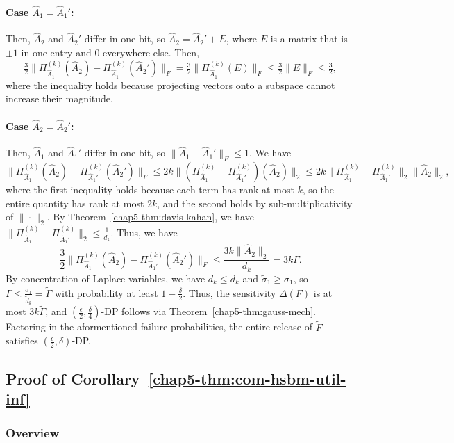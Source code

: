 \paragraph{Case $\hat{A}_1 = \hat{A}_1'$:} Then, $\hat{A}_2$ and $\hat{A}_2'$ differ in one bit, so $\hat{A}_2 = \hat{A}_2' + E$, where $E$ is a matrix that is $\pm 1$ in one entry and $0$ everywhere else.
Then,
\[
\tfrac 3 2\|\Pi_{\hat{A}_1}^{(k)}(\hat{A}_2) - \Pi_{\hat{A}_1}^{(k)}(\hat{A}_2')\|_F = \tfrac 3 2\|\Pi_{\hat{A}_1}^{(k)}(E)\|_F \leq \tfrac 3 2\|E\|_F \leq \tfrac 3 2,
\]
where the inequality holds because projecting vectors onto a subspace cannot increase their magnitude.

\paragraph{Case $\hat{A}_2 = \hat{A}_2'$:} Then, $\hat{A}_1$ and $\hat{A}_1'$ differ in one bit, so $\|\hat{A}_1 - \hat{A}_1'\|_F \leq 1$. We have
\[
\|\Pi_{\hat{A}_1}^{(k)}(\hat{A}_2) - \Pi_{\hat{A}_1'}^{(k)}(\hat{A}_2')\|_F \leq 2k \|(\Pi_{\hat{A}_1}^{(k)} - \Pi_{\hat{A}_1'}^{(k)})(\hat{A}_2)\|_2 \leq 2k\|\Pi_{\hat{A}_1}^{(k)} - \Pi_{\hat{A}_1'}^{(k)}\|_2\|\hat{A}_2\|_2,
\]
where the first inequality holds because each term has rank at most $k$, so the entire quantity has rank at most $2k$, and the  second holds by sub-multiplicativity of $\|\cdot\|_2$.
By Theorem~\ref{chap5-thm:davis-kahan}, we have $\|\Pi_{\hat{A}_1}^{(k)} - \Pi_{\hat{A}_1'}^{(k)}\|_2 \leq \frac{1}{d_k}$.
Thus, we have
\[
\frac 3 2 \|\Pi_{\hat{A}_1}^{(k)}(\hat{A}_2) - \Pi_{\hat{A}_1'}^{(k)}(\hat{A}_2')\|_F \leq \frac{3k\|\hat{A}_2\|_2}{d_k} = 3k\Gamma.
\]
By concentration of Laplace variables, we have $\tilde{d}_k \leq d_k$ and $\tilde{\sigma}_1 \geq \sigma_1$, so $\Gamma \leq \frac{\tilde{\sigma}_1}{\tilde{d}_k} = \tilde{\Gamma}$ with probability at least $1-\frac{\delta}{2}$. Thus, the sensitivity $\Delta(F)$ is at most $3k\tilde{\Gamma}$, and $(\tfrac \epsilon 2, \frac{\delta}{4})$-DP follows via Theorem~\ref{chap5-thm:gauss-mech}. Factoring in the aformentioned failure probabilities, the entire release of $\tilde{F}$ satisfies $(\tfrac \epsilon 2, \delta)$-DP.


\subsection{Proof of Corollary~\ref{chap5-thm:com-hsbm-util-inf}}\label{chap5-sec:com-hsbm-util}
\subsubsection{Overview}

